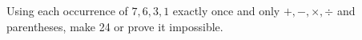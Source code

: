 Using each occurrence of $7,6,3,1$ exactly once and only $+,-,\times,\div$ and parentheses, make 24 or prove it impossible.
